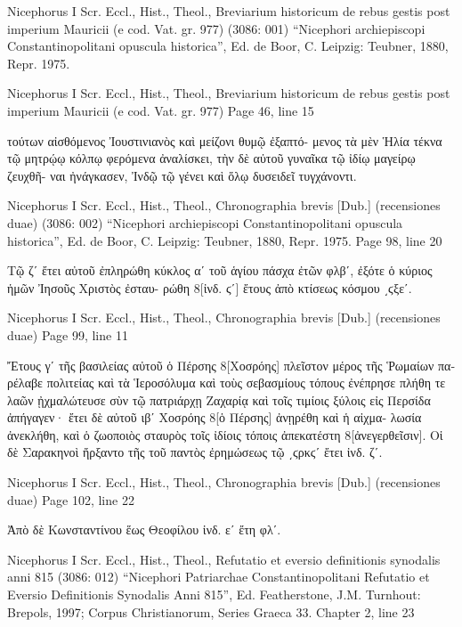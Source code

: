 \documentclass[12pt,letterpaper,twoside,final]{memoir}
\begin{document}
\begin{greek}

Nicephorus I Scr. Eccl., Hist., Theol., Breviarium historicum de rebus gestis post imperium Mauricii (e cod. Vat. gr. 977) (3086: 001)
“Nicephori archiepiscopi Constantinopolitani opuscula historica”, Ed. de Boor, C.
Leipzig: Teubner, 1880, Repr. 1975.


Nicephorus I Scr. Eccl., Hist., Theol., Breviarium historicum de rebus gestis post imperium Mauricii (e cod. Vat. gr. 977) 
Page 46, line 15

τούτων αἰσθόμενος Ἰουστινιανὸς καὶ μείζονι θυμῷ ἐξαπτό-
μενος τὰ μὲν Ἡλία τέκνα τῷ μητρῴῳ κόλπῳ φερόμενα 
ἀναλίσκει, τὴν δὲ αὐτοῦ γυναῖκα τῷ ἰδίῳ μαγείρῳ ζευχθῆ-
ναι ἠνάγκασεν, Ἰνδῷ τῷ γένει καὶ ὅλῳ δυσειδεῖ τυγχάνοντι. 

Nicephorus I Scr. Eccl., Hist., Theol., Chronographia brevis [Dub.] (recensiones duae) (3086: 002)
“Nicephori archiepiscopi Constantinopolitani opuscula historica”, Ed. de Boor, C.
Leipzig: Teubner, 1880, Repr. 1975.
Page 98, line 20

Τῷ ζʹ ἔτει αὐτοῦ ἐπληρώθη κύκλος αʹ τοῦ ἁγίου πάσχα 
 ἐτῶν φλβʹ, ἐξότε ὁ κύριος ἡμῶν Ἰησοῦς Χριστὸς ἐσταυ-
 ρώθη 8[ἰνδ. ϛʹ] ἔτους ἀπὸ κτίσεως κόσμου ͵ϛξεʹ. 

Nicephorus I Scr. Eccl., Hist., Theol., Chronographia brevis [Dub.] (recensiones duae) 
Page 99, line 11

Ἔτους γʹ τῆς βασιλείας αὐτοῦ ὁ Πέρσης 8[Χοσρόης] 
 πλεῖστον μέρος τῆς Ῥωμαίων παρέλαβε πολιτείας καὶ 
 τὰ Ἱεροσόλυμα καὶ τοὺς σεβασμίους τόπους ἐνέπρησε 
 πλήθη τε λαῶν ᾐχμαλώτευσε σὺν τῷ πατριάρχῃ Ζαχαρίᾳ 
 καὶ τοῖς τιμίοις ξύλοις εἰς Περσίδα ἀπήγαγεν· ἔτει δὲ 
 αὐτοῦ ιβʹ Χοσρόης 8[ὁ Πέρσης] ἀνῃρέθη καὶ ἡ αἰχμα-
 λωσία ἀνεκλήθη, καὶ ὁ ζωοποιὸς σταυρὸς τοῖς ἰδίοις 
 τόποις ἀπεκατέστη 8[ἀνεγερθεῖσιν]. 
 Οἱ δὲ Σαρακηνοὶ ἤρξαντο τῆς τοῦ παντὸς ἐρημώσεως 
 τῷ ͵ϛρκϛʹ ἔτει ἰνδ. ζʹ. 


Nicephorus I Scr. Eccl., Hist., Theol., Chronographia brevis [Dub.] (recensiones duae) 
Page 102, line 22

Ἀπὸ δὲ Κωνσταντίνου ἕως Θεοφίλου ἰνδ. εʹ ἔτη φλʹ. 



Nicephorus I Scr. Eccl., Hist., Theol., Refutatio et eversio definitionis synodalis anni 815 (3086: 012)
“Nicephori Patriarchae Constantinopolitani Refutatio et Eversio Definitionis Synodalis Anni 815”, Ed. Featherstone, J.M.
Turnhout: Brepols, 1997; Corpus Christianorum, Series Graeca 33.
Chapter 2, line 23


\end{greek}
\end{document}
